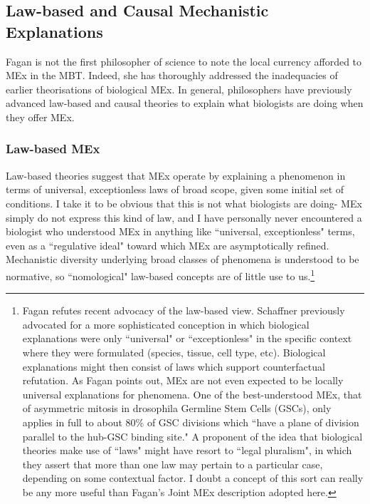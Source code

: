 \subsection{Law-based and Causal Mechanistic Explanations}

Fagan is not the first philosopher of science to note the local currency afforded to MEx in the MBT. Indeed, she has thoroughly addressed the inadequacies of earlier theorisations of biological MEx. In general, philosophers have previously advanced law-based and causal theories to explain what biologists are doing when they offer MEx.

\subsubsection{Law-based MEx}

Law-based theories suggest that MEx operate by explaining a phenomenon in terms of universal, exceptionless laws of broad scope, given some initial set of conditions. I take it to be obvious that this is not what biologists are doing- MEx simply do not express this kind of law, and I have personally never encountered a biologist who understood MEx in anything like ``universal, exceptionless" terms, even as a ``regulative ideal" toward which MEx are asymptotically refined. Mechanistic diversity underlying broad classes of phenomena is understood to be normative, so ``nomological" law-based concepts are of little use to us.\footnote{Fagan refutes recent advocacy of the law-based view. Schaffner previously advocated for a more sophisticated conception in which biological explanations were only ``universal" or ``exceptionless" in the specific context where they were formulated (species, tissue, cell type, etc). Biological explanations might then consist of laws which support counterfactual refutation. As Fagan points out, MEx are not even expected to be locally universal explanations for phenomena. One of the best-understood MEx, that of asymmetric mitosis in drosophila Germline Stem Cells (GSCs), only applies in full to about 80\% of GSC divisions which ``have a plane of division parallel to the hub-GSC binding site."
\cite[p.97]{Fagan2013}
A proponent of the idea that biological theories make use of ``laws" might have resort to ``legal pluralism", in which they assert that more than one law may pertain to a particular case, depending on some contextual factor. I doubt a concept of this sort can really be any more useful than Fagan's Joint MEx description adopted here.
}

